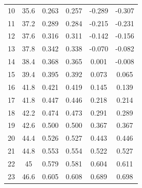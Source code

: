 \begin{table}[H]
\begin{tabular}{cccccc}
    10         & 35.6                        & 0.263                      & 0.257                       & -0.289                  & -0.307                  \\
    11         & 37.2                        & 0.289                      & 0.284                       & -0.215                  & -0.231                  \\
    12         & 37.6                        & 0.316                      & 0.311                       & -0.142                  & -0.156                  \\
    13         & 37.8                        & 0.342                      & 0.338                       & -0.070                  & -0.082                  \\
    14         & 38.4                        & 0.368                      & 0.365                       & 0.001                   & -0.008                  \\
    15         & 39.4                        & 0.395                      & 0.392                       & 0.073                   & 0.065                   \\
    16         & 41.8                        & 0.421                      & 0.419                       & 0.145                   & 0.139                   \\
    17         & 41.8                        & 0.447                      & 0.446                       & 0.218                   & 0.214                   \\
    18         & 42.2                        & 0.474                      & 0.473                       & 0.291                   & 0.289                   \\
    19         & 42.6                        & 0.500                      & 0.500                       & 0.367                   & 0.367                   \\
    20         & 44.4                        & 0.526                      & 0.527                       & 0.443                   & 0.446                   \\
    21         & 44.8                        & 0.553                      & 0.554                       & 0.522                   & 0.527                   \\
    22         & 45                          & 0.579                      & 0.581                       & 0.604                   & 0.611                   \\
    23         & 46.6                        & 0.605                      & 0.608                       & 0.689                   & 0.698                   \\

\end{tabular}
\end{table}
